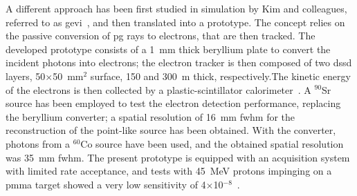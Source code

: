 A different approach has been first studied in simulation by Kim and colleagues, referred to as \gls{gevi}~\parencite{Kim2012, Kim2012ERR}, and then translated into a prototype. The concept relies on the passive conversion of \gls{pg} rays to electrons, that are then tracked. The developed prototype consists of a 1~mm thick beryllium plate to convert the incident photons into electrons; the electron tracker is then composed of two \gls{dssd} layers, 50$\times$50~mm$^2$ surface, 150 and 300~\charmu m thick, respectively.The kinetic energy of the electrons is then collected by a plastic-scintillator calorimeter~\parencite{Lee2017}. A $^90$Sr source has been employed to test the electron detection performance, replacing the beryllium converter; a spatial resolution of 16~mm \gls{fwhm} for the reconstruction of the point-like source has been obtained. With the converter, photons from a $^60$Co source have been used, and the obtained spatial resolution was 35~mm \gls{fwhm}. The present prototype is equipped with an acquisition system with limited rate acceptance, and tests with 45~MeV protons impinging on a \gls{pmma} target showed a very low sensitivity of 4$\times$10$^{-8}$~\parencite{Lee2017}.   

